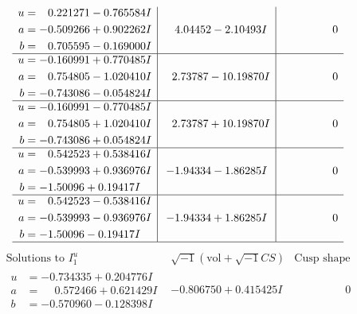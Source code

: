 \documentclass[1p]{elsarticle_modified}
\theoremstyle{definition}
\newcommand{\I}{\sqrt{-1}}
\begin{document}
$$\begin{array}{c|c|c}
\begin{aligned}
u &= \phantom{-}0.221271 - 0.765584 I \\
a &= -0.509266 + 0.902262 I \\
b &= \phantom{-}0.705595 - 0.169000 I\end{aligned}
 & \phantom{-}4.04452 - 2.10493 I & \phantom{-0.000000 } 0 \\ \hline\begin{aligned}
u &= -0.160991 + 0.770485 I \\
a &= \phantom{-}0.754805 - 1.020410 I \\
b &= -0.743086 - 0.054824 I\end{aligned}
 & \phantom{-}2.73787 - 10.19870 I & \phantom{-0.000000 } 0 \\ \hline\begin{aligned}
u &= -0.160991 - 0.770485 I \\
a &= \phantom{-}0.754805 + 1.020410 I \\
b &= -0.743086 + 0.054824 I\end{aligned}
 & \phantom{-}2.73787 + 10.19870 I & \phantom{-0.000000 } 0 \\ \hline\begin{aligned}
u &= \phantom{-}0.542523 + 0.538416 I \\
a &= -0.539993 + 0.936976 I \\
b &= -1.50096 + 0.19417 I\end{aligned}
 & -1.94334 - 1.86285 I & \phantom{-0.000000 } 0 \\ \hline\begin{aligned}
u &= \phantom{-}0.542523 - 0.538416 I \\
a &= -0.539993 - 0.936976 I \\
b &= -1.50096 - 0.19417 I\end{aligned}
 & -1.94334 + 1.86285 I & \phantom{-0.000000 } 0\\
 \hline 
 \end{array}$$\newpage$$\begin{array}{c|c|c}  
\text{Solutions to }I^u_{1}& \I (\text{vol} + \sqrt{-1}CS) & \text{Cusp shape}\\
 \hline 
\begin{aligned}
u &= -0.734335 + 0.204776 I \\
a &= \phantom{-}0.572466 + 0.621429 I \\
b &= -0.570960 - 0.128398 I\end{aligned}
 & -0.806750 + 0.415425 I & \phantom{-0.000000 } 0 \\ \hline\begin{aligned}

\end{aligned}
\end{array}$$
\end{document}
